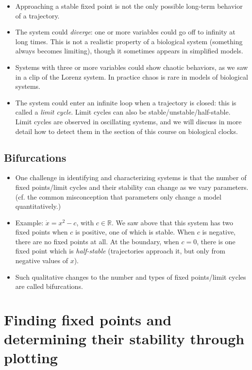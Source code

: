 \documentclass{article}
\begin{document}
\begin{itemize}

\item Approaching a stable fixed point is not the only possible long-term behavior of a trajectory.

\item The system could \textit{diverge}: one or more variables could go off to infinity at long times. This is not a realistic property of a biological system (something always becomes limiting), though it sometimes appears in simplified models.

\item Systems with three or more variables could show chaotic behaviors, as we saw in a clip of the Lorenz system. In practice chaos is rare in models of biological systems.

\item The system could enter an infinite loop when a trajectory is closed: this is called a \textit{limit cycle}. Limit cycles can also be stable/unstable/half-stable. Limit cycles are observed in oscillating systems, and we will discuss in more detail how to detect them in the section of this course on biological clocks.

\end{itemize}

\subsection*{Bifurcations}

\begin{itemize}
\item One challenge in identifying and characterizing systems is that the number of fixed points/limit cycles and their stability can change as we vary parameters. (cf. the common misconception that parameters only change a model quantitatively.)
\item Example: $\dot{x} = x^2 - c$, with $c \in \mathbb{R}$. We saw above that this system has two fixed points when $c$ is positive, one of which is stable. When $c$ is negative, there are no fixed points at all. At the boundary, when $c=0$, there is one fixed point which is \textit{half-stable} (trajectories approach it, but only from negative values of $x$).
\item Such qualitative changes to the number and types of fixed points/limit cycles are called bifurcations.
\end{itemize}

\section*{Finding fixed points and determining their stability through plotting}
\end{document}
